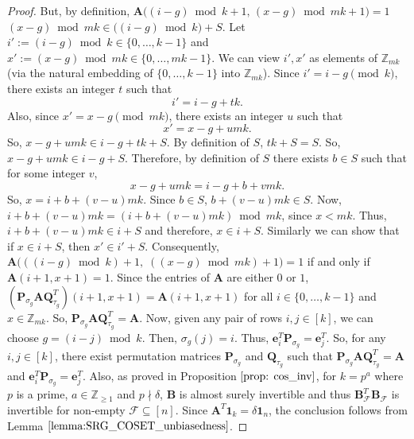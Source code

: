 \documentclass[journal,draftcls,onecolumn]{IEEEtran}
\theoremstyle{mystyle}
\newcommand{\bfQ}{\mathbf{Q}}
\newcommand{\bfA}{\mathbf{A}}
\newcommand{\bfB}{\mathbf{B}}
\newcommand{\bfP}{\mathbf{P}}
\newcommand{\cF}{\mathcal{F}}
\begin{document}
\begin{proof}
But, by definition, $\bfA\big((i-g)\bmod k + 1,\,(x-g)\bmod mk + 1\big)=1$
$(x-g)\bmod mk \in \big((i-g)\bmod k\big)+S$. 
Let $i':=(i-g)\bmod{k}\in\{0,\dots,k-1\}$ and $x':=(x-g)\bmod{mk}\in\{0,\dots,mk-1\}$.
We can view $i',x'$ as elements of $\mathbb{Z}_{mk}$ (via the natural embedding of $\{0,\dots,k-1\}$ into $\mathbb{Z}_{mk}$). 
Since $i' = i-g \pmod{k}$, there exists an integer $t$ such that
\[
i' = i-g + tk.
\]
Also, since $x' = x-g \pmod{mk}$, there exists an integer $u$ such that
\[
x' = x-g + umk.
\]
So, $x-g+umk \in i -g + tk + S$. By definition of $S$, $tk +S = S$. So, $x-g+umk \in i -g + S$. Therefore, by definition of $S$ there exists $b \in S$ such that for some integer $v$, 
\[ x-g + umk = i-g+b + vmk.\] So, $x = i+b + (v-u) mk$. Since $b \in S$, $b + (v-u)mk \in S$. Now, $ i + b + (v-u)mk = (i +  b  + (v-u)mk) \bmod mk$, since $x < mk$. Thus, $i +  b  + (v-u)mk \in i +S$ and therefore, $x \in i +S$. Similarly we can show that if $x \in i +S$, then $x' \in i' +S$. Consequently, 
$\bfA\!\Big( ((i-g)\bmod{k})+1,\; ((x-g)\bmod{mk})+1 \Big)=1$
if and only if  $\bfA(i+1,x+1)=1$. Since the entries of $\bfA$ are either $0$ or $1$,  $(\bfP_{\sigma_g} \bfA \mathbf{Q}_{\tau_g}^{T})(i+1,x+1)= \bfA(i+1,x+1)$ for all $i \in \{0, \dots, k-1\}$ and $x \in \mathbb{Z}_{mk}$. So, $\bfP_{\sigma_g} \bfA \mathbf{Q}_{\tau_g}^{T} = \bfA$. Now, given any pair of rows $i,j \in [k]$, we can choose $g =  (i-j) \bmod k$. Then, $\sigma_g(j) = i$. Thus,
$
\mathbf{e}_i^T\bfP_{\sigma_g}  = \mathbf{e}_j^T.
$
So, for any $i,j \in [k]$, there exist permutation matrices $\bfP_{\sigma_g}$ and $\bfQ_{\tau_g}$ such that $\bfP_{\sigma_g} \bfA \bfQ_{\tau_g}^T = \bfA$ and $\mathbf{e}_i^T \bfP_{\sigma_g} = \mathbf{e}_j^T$. Also, as proved in Proposition $\ref{prop: cos_inv}$, for $k = p^a$ where $p$ is a prime, $a \in \mathbb{Z}_{\ge 1}$ and $p \nmid \delta$, $\bfB$ is almost surely invertible and thus $\bfB_{\cF}^T \bfB_{\cF}$ is invertible for non-empty $\cF \subseteq [n]$. Since $\bfA^T \mathbf{1}_k = \delta \mathbf{1}_n$, the conclusion follows from Lemma $\ref{lemma:SRG_COSET_unbiasedness}$.
\end{proof}
\end{document}
